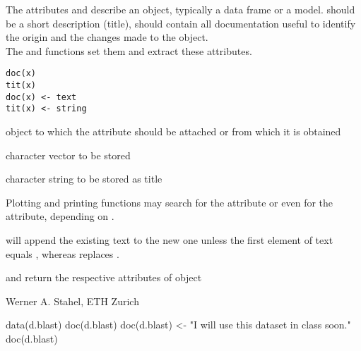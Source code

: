 \documentclass{article}
\begin{document}
\begin{Description}\relax
The attributes  and  describe an object, typically
a data frame or a model.  should be a short description (title),
 should contain all documentation useful to identify
the origin and the changes made to the object.\\
The  and  functions set them and extract these
attributes.
\end{Description}
\begin{Usage}
\begin{verbatim}
doc(x)
tit(x) 
doc(x) <- text
tit(x) <- string
\end{verbatim}
\end{Usage}
\begin{Arguments}
\begin{ldescription}
\item[\code{x}] object to which the  attribute should be attached
or from which it is obtained
\item[\code{text}] character vector to be stored
\item[\code{string}] character string to be stored as title
\end{ldescription}
\end{Arguments}
\begin{Details}\relax
Plotting and printing functions may search for the 
attribute or even for the  attribute, depending on
.

 will append the existing  text to
the new one unless the first element of text equals ,
whereas  replaces .
\end{Details}
\begin{Value}
 and  return the respective attributes of object
\end{Value}
\begin{Author}\relax
Werner A. Stahel, ETH Zurich
\end{Author}
\begin{Examples}
\begin{ExampleCode}
data(d.blast)
doc(d.blast)
doc(d.blast) <- "I will use this dataset in class soon."
doc(d.blast)
\end{ExampleCode}
\end{Examples}
\end{document}
